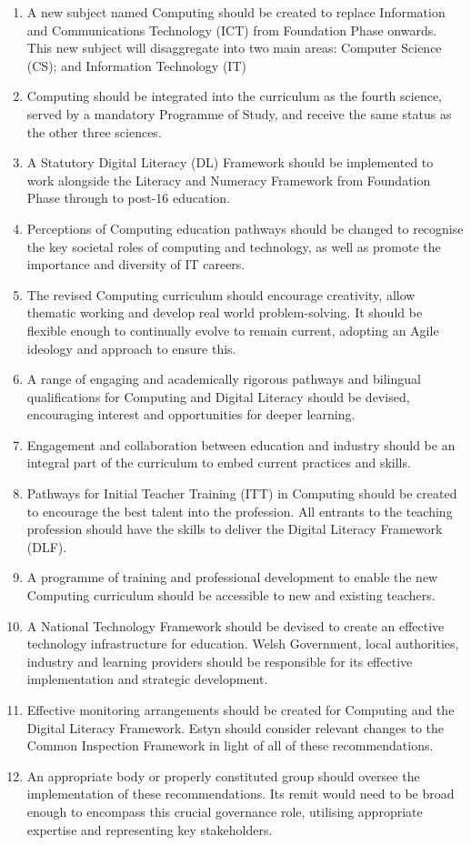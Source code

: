 \documentclass{sig-alternate}
\begin{document}
\begin{enumerate}
\item A new subject named Computing should be created to replace
  Information and Communications Technology (ICT) from Foundation
  Phase onwards. This new subject will disaggregate into two main
  areas: Computer Science (CS); and Information Technology (IT)
\item Computing should be integrated into the curriculum as the fourth
  science, served by a mandatory Programme of Study, and receive the
  same status as the other three sciences.
\item A Statutory Digital Literacy (DL) Framework should be
  implemented to work alongside the Literacy and Numeracy Framework
  from Foundation Phase through to post-16 education.
\item Perceptions of Computing education pathways should be changed to
  recognise the key societal roles of computing and technology, as
  well as promote the importance and diversity of IT careers.
\item The revised Computing curriculum should encourage creativity,
  allow thematic working and develop real world problem-solving. It
  should be flexible enough to continually evolve to remain current,
  adopting an Agile ideology and approach to ensure this.
\item A range of engaging and academically rigorous pathways and
  bilingual qualifications for Computing and Digital Literacy should
  be devised, encouraging interest and opportunities for deeper
  learning.
\item Engagement and collaboration between education and industry
  should be an integral part of the curriculum to embed current
  practices and skills.
\item Pathways for Initial Teacher Training (ITT) in Computing should
  be created to encourage the best talent into the profession. All
  entrants to the teaching profession should have the skills to
  deliver the Digital Literacy Framework (DLF).
\item A programme of training and professional development to enable
  the new Computing curriculum should be accessible to new and
  existing teachers.
\item A National Technology Framework should be devised to create an
  effective technology infrastructure for education. Welsh Government,
  local authorities, industry and learning providers should be
  responsible for its effective implementation and strategic
  development.
\item Effective monitoring arrangements should be created for
  Computing and the Digital Literacy Framework. Estyn should consider
  relevant changes to the Common Inspection Framework in light of all
  of these recommendations.
\item An appropriate body or properly constituted group should oversee
  the implementation of these recommendations. Its remit would need to
  be broad enough to encompass this crucial governance role, utilising
  appropriate expertise and representing key stakeholders.
\end{enumerate}
\end{document}
